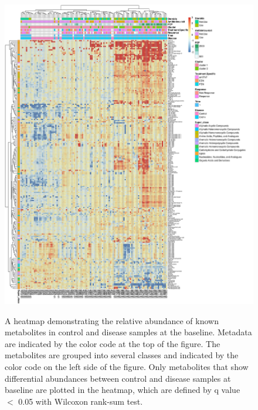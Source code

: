 \begin{figure}[hp]
\centering
{\includegraphics[scale=0.4,trim=0 0 0 0,clip]{Figure/F54_Metabolites_Heatmap.png}
}
\caption[A heatmap demonstrating the relative abundance of known metabolites]{A heatmap demonstrating the relative abundance of known metabolites in control and disease samples at the  baseline. Metadata are indicated by the color code at the top of the figure. The metabolites are grouped into several classes and indicated by the color code on the left side of the figure. Only metabolites that show differential abundances between control and disease samples at baseline are plotted in the heatmap, which are defined by q value $<$ 0.05 with Wilcoxon rank-sum test.}
\label{F54_Metabolites_Heatmap}
\end{figure}



